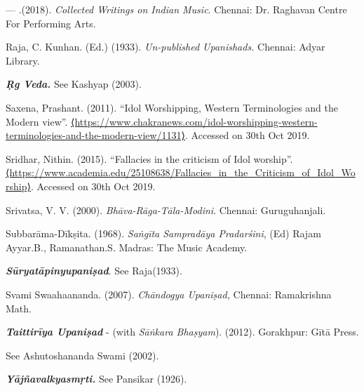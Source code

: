 \begin{thebibliography}{99}
  — .(2018). \textit{Collected Writings on Indian Music}. Chennai: Dr. Raghavan Centre For Performing Arts.

  Raja, C. Kunhan. (Ed.) (1933). \textit{Un-published Upanishads.} Chennai: Adyar Library.

  \textbf{\textit{Ṛg Veda.}} See Kashyap (2003).

  Saxena, Prashant. (2011). “Idol Worshipping, Western Terminologies and the Modern view”. \url{⟨https://www.chakranews.com/idol-worshipping-western-terminologies-and-the-modern-view/1131⟩}. Accessed on 30th Oct 2019.

  Sridhar, Nithin. (2015). “Fallacies in the criticism of Idol worship”. \url{⟨https://www.academia.edu/25108638/Fallacies_in_the_Criticism_of_Idol_Worship⟩}. Accessed on 30th Oct 2019.

  Srivatsa, V. V. (2000). \textit{Bhāva-Rāga-Tāla-Modini}. Chennai: Guruguhanjali.

  Subbarāma-Dīkṣita. (1968). \textit{Saṅgīta Sampradāya Pradarśini}, (Ed) Rajam Ayyar.B., Ramanathan.S. Madras: The Music Academy.

  \textbf{\textit{Sūryatāpinyupaniṣad}}. See Raja(1933).

  Svami Swaahaananda. (2007).\textit{ Chāndogya Upaniṣad,} Chennai: Rama\-krishna Math.

  \textbf{\textit{Taittirīya Upaniṣad}} - (with \textit{Sāṅkara Bhaṣyam}). (2012). Gorakhpur: Gītā Press.

  \hspace{.5cm}See Ashutoshananda Swami (2002).

  \textbf{\textit{Yājñavalkyasmṛti.}} See Pansikar (1926).

 \end{thebibliography}

\theendnotes
\label{endchapter1}
